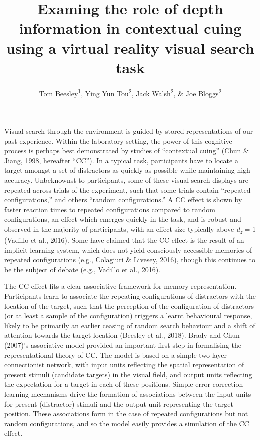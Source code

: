 \documentclass[
  english,
  man,floatsintext]{apa7}
\title{Examing the role of depth information in contextual cuing using a virtual reality visual search task}
\author{Tom Beesley\textsuperscript{1}, Ying Yun Tou\textsuperscript{2}, Jack Walsh\textsuperscript{2}, \& Joe Bloggs\textsuperscript{2}}
\date{}
\affiliation{\vspace{0.5cm}\textsuperscript{1} Lancaster University, UK\\\textsuperscript{2} UNSW Sydney, Australia}
\begin{document}
\maketitle

Visual search through the environment is guided by stored representations of our past experience. Within the laboratory setting, the power of this cognitive process is perhaps best demonstrated by studies of ``contextual cuing'' (Chun \& Jiang, 1998, hereafter {``CC''}). In a typical task, participants have to locate a target amongst a set of distractors as quickly as possible while maintaining high accuracy. Unbeknownst to participants, some of these visual search displays are repeated across trials of the experiment, such that some trials contain ``repeated configurations,'' and others ``random configurations.'' A CC effect is shown by faster reaction times to repeated configurations compared to random configurations, an effect which emerges quickly in the task, and is robust and observed in the majority of participants, with an effect size typically above \emph{d\textsubscript{z}} = 1 (Vadillo et al., 2016). Some have claimed that the CC effect is the result of an implicit learning system, which does not yield consciously accessible memories of repeated configurations (e.g., Colagiuri \& Livesey, 2016), though this continues to be the subject of debate (e.g., Vadillo et al., 2016).

The CC effect fits a clear associative framework for memory representation. Participants learn to associate the repeating configurations of distractors with the location of the target, such that the perception of the configuration of distractors (or at least a sample of the configuration) triggers a learnt behavioural response, likely to be primarily an earlier ceasing of random search behaviour and a shift of attention towards the target location (Beesley et al., 2018). Brady and Chun (2007)'s associative model provided an important first step in formalising the representational theory of CC. The model is based on a simple two-layer connectionist network, with input units reflecting the spatial representation of present stimuli (candidate targets) in the visual field, and output units reflecting the expectation for a target in each of these positions. Simple error-correction learning mechanisms drive the formation of associations between the input units for present (distractor) stimuli and the output unit representing the target position. These associations form in the case of repeated configurations but not random configurations, and so the model easily provides a simulation of the CC effect.
\end{document}

